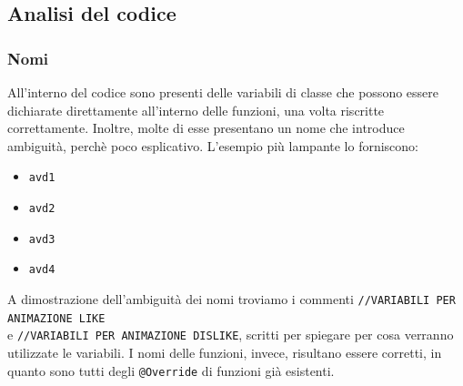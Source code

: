 



\inputminted[linenos, frame=lines]{java}{../old/EventAdapter.java}

\subsection{Analisi del codice}
\subsubsection{Nomi}
All'interno del codice sono presenti delle variabili di classe che possono essere dichiarate direttamente all'interno delle funzioni, una volta riscritte correttamente.
Inoltre, molte di esse presentano un nome che introduce ambiguità, perchè poco esplicativo. L'esempio più lampante lo forniscono:
\begin{itemize}
    \item \verb|avd1|
    \item \verb|avd2|
    \item \verb|avd3|
    \item \verb|avd4|
\end{itemize}
A dimostrazione dell'ambiguità dei nomi troviamo i commenti \verb|//VARIABILI PER ANIMAZIONE LIKE|\\ e \verb|//VARIABILI PER ANIMAZIONE DISLIKE|, scritti per spiegare per cosa verranno utilizzate le variabili.
I nomi delle funzioni, invece, risultano essere corretti, in quanto sono tutti degli \verb|@Override| di funzioni già esistenti.
